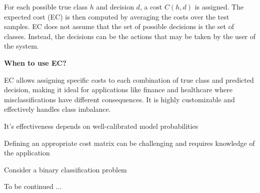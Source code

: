 For each possible true class $h$ and decision $d$, a cost $C(h, d)$ is assigned. The expected cost (EC) is then computed by averaging the costs over the test samples. EC does not assume that the set of possible decisions is the set of classes. Instead, the decisions can be the actions that may be taken by the user of the system.


\textbf{When to use EC?}


EC allows assigning specific costs to each combination of true class and predicted decision, making it ideal for applications like finance and healthcare where misclassifications have different consequences. It is highly customizable and effectively handles class imbalance.

{
\item It's effectiveness depends on well-calibrated model probabilities 
\item Defining an appropriate cost matrix can be challenging and requires knowledge of the application 
}


\clearpage
\thispagestyle{classificationstyle}



Consider a binary classification problem 

To be continued ...